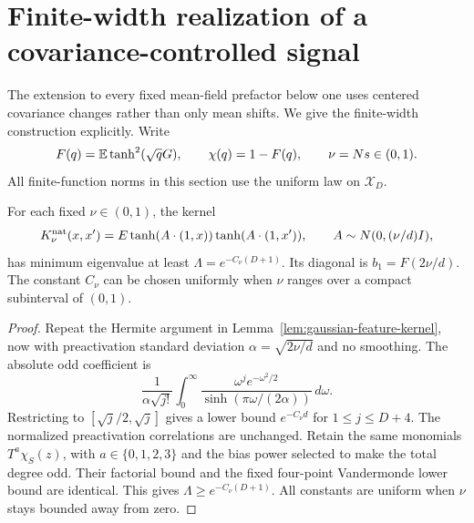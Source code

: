 \section{Finite-width realization of a covariance-controlled signal}
\label{sec:prefactor-covariance-realization}
The extension to every fixed mean-field prefactor below one uses centered covariance changes rather than only mean shifts. We give the finite-width construction explicitly. Write
\[
 F(q)=\mathbb E\tanh^2(\sqrt qG),\qquad \chi(q)=1-F(q),
 \qquad \nu=Ns\in(0,1).
\]
All finite-function norms in this section use the uniform law on $\mathcal X_D$.

\begin{lemma}
\label{lem:prefactor-native-kernel}
For each fixed $\nu\in(0,1)$, the kernel
\[
 K_\nu^{\rm nat}(x,x')=E\tanh(A\cdot(1,x))\tanh(A\cdot(1,x')),
 \qquad A\sim N(0,(\nu/d)I),
\]
has minimum eigenvalue at least $\Lambda=e^{-C_\nu(D+1)}$. Its diagonal is $b_1=F(2\nu/d)$. The constant $C_\nu$ can be chosen uniformly when $\nu$ ranges over a compact subinterval of $(0,1)$.
\end{lemma}
\begin{proof}
Repeat the Hermite argument in Lemma~\ref{lem:gaussian-feature-kernel}, now with preactivation standard deviation $\alpha=\sqrt{2\nu/d}$ and no smoothing. The absolute odd coefficient is
\[
 \frac1{\alpha\sqrt{j!}}\int_0^\infty
       \frac{\omega^j e^{-\omega^2/2}}
            {\sinh(\pi\omega/(2\alpha))}\,d\omega.
\]
Restricting to $[\sqrt j/2,\sqrt j]$ gives a lower bound $e^{-C_\nu d}$ for $1\le j\le D+4$. The normalized preactivation correlations are unchanged. Retain the same monomials $T^a\chi_S(z)$, with $a\in\{0,1,2,3\}$ and the bias power selected to make the total degree odd. Their factorial bound and the fixed four-point Vandermonde lower bound are identical. This gives $\Lambda\ge e^{-C_\nu(D+1)}$. All constants are uniform when $\nu$ stays bounded away from zero.
\end{proof}

